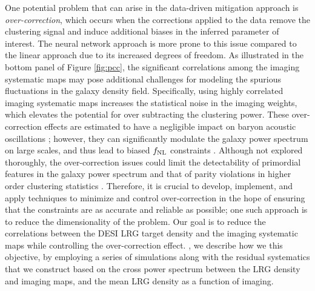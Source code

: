  One potential problem that can arise in the data-driven mitigation approach is \textit{over-correction}, which occurs when the corrections applied to the data remove the clustering signal and induce additional biases in the inferred parameter of interest. The neural network approach is more prone to this issue compared to the linear approach due to its increased degrees of freedom. As illustrated in the bottom panel of Figure \ref{fig:pcc}, the significant correlations among the imaging systematic maps may pose additional challenges for modeling the spurious fluctuations in the galaxy density field. Specifically, using highly correlated imaging systematic maps increases the statistical noise in the imaging weights, which elevates the potential for over subtracting the clustering power. These over-correction effects are estimated to have a negligible impact on baryon acoustic oscillations \citep{merz2021clustering}; however, they can significantly modulate the galaxy power spectrum on large scales, and thus lead to biased $f_{\rm NL}$ constraints \citep{rezaie2021primordial, mueller2022primordial}. Although not explored thoroughly, the over-correction issues could limit the detectability of primordial features in the galaxy power spectrum and that of parity violations in higher order clustering statistics \citep{beutler2019primordial, cahn2021test, philcox2022probing}. Therefore, it is crucial to develop, implement, and apply techniques to minimize and control over-correction in the hope of ensuring that the constraints are as accurate and reliable as possible; one such approach is to reduce the dimensionality of the problem. Our goal is to reduce the correlations between the DESI LRG target density and the imaging systematic maps while controlling the over-correction effect. , we describe how we   this objective, by employing a series of simulations along with the residual systematics that we construct based on the cross power spectrum between the LRG density and imaging maps, and the mean LRG density as a function of imaging. 
